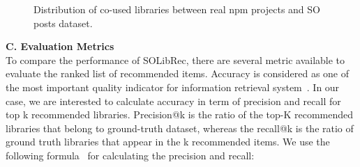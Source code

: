 \documentclass[paper]{ieice}
\begin{document}
\begin{figure}[t]
    \centering
    {}
  
 
    \caption{Distribution of co-used libraries between real npm projects and SO posts dataset.}
   
    \label{fig:distribution}
    \end{figure}


 

\noindent\textbf{C. Evaluation Metrics}\\

To compare the performance of SOLibRec, there are several metric available to evaluate the ranked list of recommended items. Accuracy is considered as one of the most important quality indicator for information retrieval system~\cite{saracevic1995evaluation}. In our case, we are interested to calculate accuracy in term of precision and recall for top k recommended libraries. Precision@k is the ratio of the top-K recommended libraries that belong to ground-truth dataset, whereas the recall@k is the ratio of ground truth libraries that appear in the k recommended items. We use the following formula~\cite{herlocker2004evaluating} for calculating the precision and recall:
\end{document}
